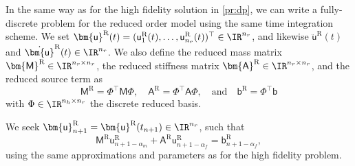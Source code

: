 In the same way as for the high fidelity solution in \cref{pr:dp}, we can write a fully-discrete problem for the reduced order model using the same time integration scheme. 
We set $\bm{\mathsf{u}}^{\textrm{R}}(t) = (\mathsf{u}^{\textrm{R}}_1(t),\dots, \mathsf{u}^{\textrm{R}}_{n_r}(t))^{\top} \in \IR^{n_r}$, and likewise $\ddot{\bm{\mathsf{u}}}^{\textrm{R}}(t)$ and $\dot{\bm{\mathsf{u}}}^{\textrm{R}}(t) \in \IR^{n_r}$. We also define the reduced mass matrix $\bm{\mathsf{M}}^{\textrm{R}} \in \IR^{n_r \times n_r}$, the reduced stiffness matrix $\bm{\mathsf{A}}^{\textrm{R}} \in \IR^{n_r \times n_r}$, and the reduced source term as
\begin{equation}
	\bm{\mathsf{M}}^{\textrm{R}} = \Phi^\top \bm{\mathsf{M}} \Phi, \quad \bm{\mathsf{A}}^{\textrm{R}} = \Phi^\top \bm{\mathsf{A}} \Phi, \quad \text{and} \quad \bm{\mathsf{b}}^{\textrm{R}} = \Phi^\top \bm{\mathsf{b}}
\end{equation}
with $\Phi \in \IR^{n_h \times n_r}$ the discrete reduced basis.

\begin{problem} \label{pr:dpr}
We seek $\bm{\mathsf{u}}^{\textrm{R}}_{n+1} = \bm{\mathsf{u}}^{\textrm{R}}(t_{n+1}) \in \IR^{n_r}$, such that
\begin{equation}
    \bm{\mathsf{M}}^{\textrm{R}} \ddot{\bm{\mathsf{u}}}^{\textrm{R}}_{n+1-\alpha_{m}} + \bm{\mathsf{A}}^{\textrm{R}} \bm{\mathsf{u}}^{\textrm{R}}_{n+1-\alpha_{f}} = \bm{\mathsf{b}}^{\textrm{R}}_{n+1-\alpha_{f}},
\end{equation}
using the same approximations and parameters as for the high fidelity problem.
\end{problem}
